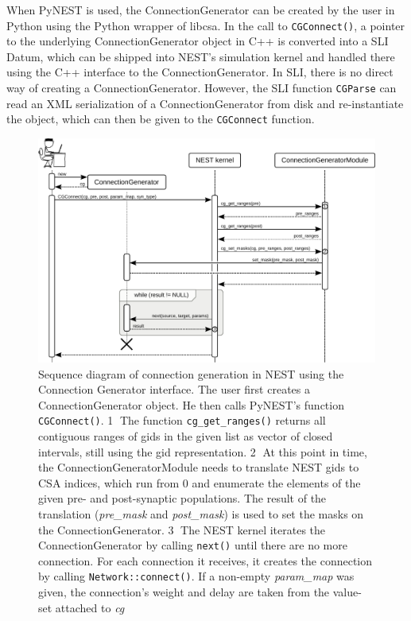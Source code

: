 \documentclass{frontiersSCNS} %
\begin{document}

When PyNEST is used, the ConnectionGenerator can be created by the
user in Python using the Python wrapper of libcsa. In the call to
\texttt{CGConnect()}, a pointer to the underlying ConnectionGenerator
object in C++ is converted into a SLI Datum, which can be shipped into
NEST's simulation kernel and handled there using the C++ interface to
the ConnectionGenerator. In SLI, there is no direct way of creating a
ConnectionGenerator. However, the SLI function \texttt{CGParse} can
read an XML serialization of a ConnectionGenerator from disk and
re-instantiate the object, which can then be given to the
\texttt{CGConnect} function.

\begin{figure}[ht]
\centering
\includegraphics[scale=.8]{figures/sequence_diagram_nest.pdf}
\caption{Sequence diagram of connection generation in NEST using the
  Connection Generator interface. The user first creates a
  ConnectionGenerator object. He then calls PyNEST's function
  \texttt{CGConnect()}. \textcircled{\footnotesize 1} The function
  \texttt{cg\_get\_ranges()} returns all contiguous ranges of gids in
  the given list as vector of closed intervals, still using the gid
  representation. \textcircled{\footnotesize 2} At this point in time,
  the ConnectionGeneratorModule needs to translate NEST gids to CSA
  indices, which run from 0 and enumerate the elements of the given
  pre- and post-synaptic populations. The result of the translation
  (\emph{pre\_mask} and \emph{post\_mask}) is used to set the masks on
  the ConnectionGenerator. \textcircled{\footnotesize 3} The NEST
  kernel iterates the ConnectionGenerator by calling \texttt{next()}
  until there are no more connection. For each connection it receives,
  it creates the connection by calling \texttt{Network::connect()}. If
  a non-empty \emph{param\_map} was given, the connection's weight and
  delay are taken from the value-set attached to
  \emph{cg}}\label{fig:sequence_diagram_nest}
\end{figure}
\end{document}
